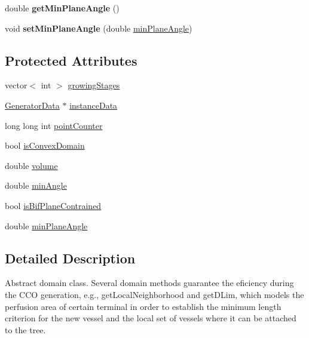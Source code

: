 \begin{DoxyCompactItemize}
\item 
double {\bfseries get\+Min\+Plane\+Angle} ()\hypertarget{class_abstract_domain_a464979f1f4d9c8445adefdfe3c09c511}{}\label{class_abstract_domain_a464979f1f4d9c8445adefdfe3c09c511}

\item 
void {\bfseries set\+Min\+Plane\+Angle} (double \hyperlink{class_abstract_domain_abf41d751c56a23ba910dd8860d302872}{min\+Plane\+Angle})\hypertarget{class_abstract_domain_a4a92188160489f4799f00955ae1ff523}{}\label{class_abstract_domain_a4a92188160489f4799f00955ae1ff523}

\end{DoxyCompactItemize}
\subsection*{Protected Attributes}
\begin{DoxyCompactItemize}
\item 
vector$<$ int $>$ \hyperlink{class_abstract_domain_a765dfd145f6559fc26cc0a36f1bf034a}{growing\+Stages}
\item 
\hyperlink{class_generator_data}{Generator\+Data} $\ast$ \hyperlink{class_abstract_domain_aa37fbabc2bfa92c574f7db7544016b53}{instance\+Data}
\item 
long long int \hyperlink{class_abstract_domain_af6ca325d56ec51a792d2c0c049e424b0}{point\+Counter}
\item 
bool \hyperlink{class_abstract_domain_acaa76f4d7e102e66b64d10cd652167c9}{is\+Convex\+Domain}
\item 
double \hyperlink{class_abstract_domain_a1cd2c4a6df09d717a7c77c82066f8060}{volume}
\item 
double \hyperlink{class_abstract_domain_afa74f9bbc9eb00511fa714ece659e24c}{min\+Angle}
\item 
bool \hyperlink{class_abstract_domain_a1b9397f6ac56e1a973d812498153be95}{is\+Bif\+Plane\+Contrained}
\item 
double \hyperlink{class_abstract_domain_abf41d751c56a23ba910dd8860d302872}{min\+Plane\+Angle}
\end{DoxyCompactItemize}


\subsection{Detailed Description}
Abstract domain class. Several domain methods guarantee the eficiency during the C\+CO generation, e.\+g., get\+Local\+Neighborhood and get\+D\+Lim, which models the perfusion area of certain terminal in order to establish the minimum length criterion for the new vessel and the local set of vessels where it can be attached to the tree. 

